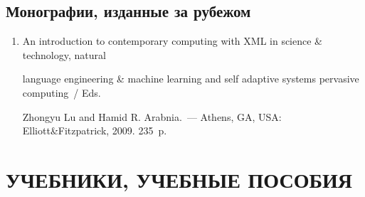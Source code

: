 




\vspace*{-6pt}





\subsection{Монографии, изданные за рубежом} %





\begin{enumerate}[1.]


\item




An introduction to contemporary computing with XML in science \& technology, natural 


language engineering \& machine learning and self adaptive systems pervasive computing~/ Eds. 


Zhongyu Lu and Hamid R. Arabnia.~--- Athens, GA, USA: Elliott\&Fitzpatrick, 2009. 235~p.


\end{enumerate}










\vspace*{-6pt}





\section{УЧЕБНИКИ, УЧЕБНЫЕ ПОСОБИЯ}










\noindent


